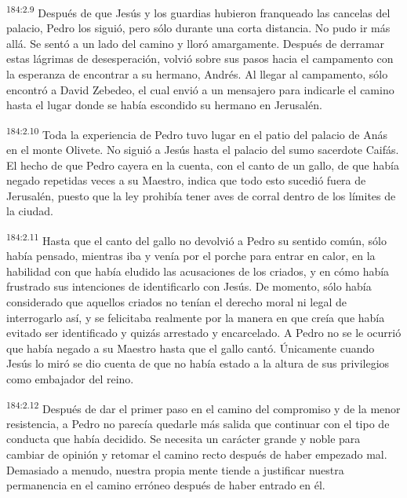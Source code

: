 \par 
\textsuperscript{184:2.9} Después de que Jesús y los guardias hubieron franqueado las cancelas del palacio, Pedro los siguió, pero sólo durante una corta distancia. No pudo ir más allá. Se sentó a un lado del camino y lloró amargamente. Después de derramar estas lágrimas de desesperación, volvió sobre sus pasos hacia el campamento con la esperanza de encontrar a su hermano, Andrés. Al llegar al campamento, sólo encontró a David Zebedeo, el cual envió a un mensajero para indicarle el camino hasta el lugar donde se había escondido su hermano en Jerusalén.

\par 
\textsuperscript{184:2.10} Toda la experiencia de Pedro tuvo lugar en el patio del palacio de Anás en el monte Olivete. No siguió a Jesús hasta el palacio del sumo sacerdote Caifás. El hecho de que Pedro cayera en la cuenta, con el canto de un gallo, de que había negado repetidas veces a su Maestro, indica que todo esto sucedió fuera de Jerusalén, puesto que la ley prohibía tener aves de corral dentro de los límites de la ciudad.

\par 
\textsuperscript{184:2.11} Hasta que el canto del gallo no devolvió a Pedro su sentido común, sólo había pensado, mientras iba y venía por el porche para entrar en calor, en la habilidad con que había eludido las acusaciones de los criados, y en cómo había frustrado sus intenciones de identificarlo con Jesús. De momento, sólo había considerado que aquellos criados no tenían el derecho moral ni legal de interrogarlo así, y se felicitaba realmente por la manera en que creía que había evitado ser identificado y quizás arrestado y encarcelado. A Pedro no se le ocurrió que había negado a su Maestro hasta que el gallo cantó. Únicamente cuando Jesús lo miró se dio cuenta de que no había estado a la altura de sus privilegios como embajador del reino.

\par 
\textsuperscript{184:2.12} Después de dar el primer paso en el camino del compromiso y de la menor resistencia, a Pedro no parecía quedarle más salida que continuar con el tipo de conducta que había decidido. Se necesita un carácter grande y noble para cambiar de opinión y retomar el camino recto después de haber empezado mal. Demasiado a menudo, nuestra propia mente tiende a justificar nuestra permanencia en el camino erróneo después de haber entrado en él.


